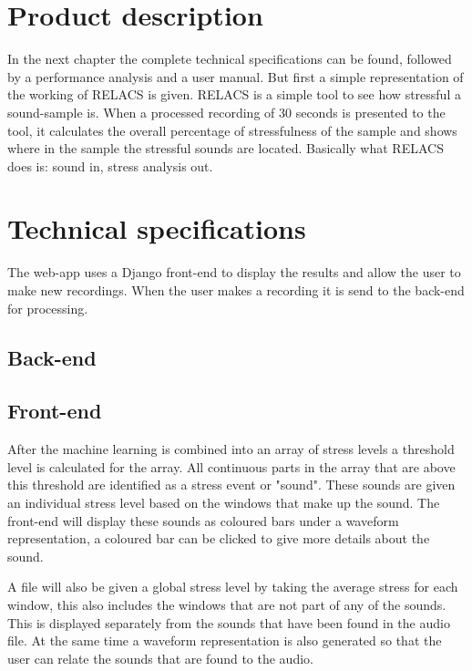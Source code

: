\documentclass[a4paper]{article}
\begin{document}
\section{Product description}
In the next chapter the complete technical specifications can be found, followed by a performance analysis and a user manual. 
But first a simple representation of the working of RELACS is given. RELACS is a simple tool to see how stressful a sound-sample is. 
When a processed recording of 30 seconds is presented to the tool, it calculates the overall percentage of stressfulness of the sample and shows where in the sample the stressful sounds are located. 
Basically what RELACS does is: sound in, stress analysis out.


\section{Technical specifications}

The web-app uses a Django front-end to display the results and allow the user
to make new recordings. When the user makes a recording it is send to the back-end for processing. 

\subsection{Back-end}



\subsection{Front-end}

After the machine learning is combined into an array of stress levels a threshold 
level is calculated for the array. All continuous parts in the array that are
above this threshold are identified as a stress event or "sound". These sounds
are given an individual stress level based on the windows that make up the
sound. The front-end will display these sounds as coloured bars under a waveform
representation, a coloured bar can be clicked to give more details about the
sound.

A file will also be given a global stress level by taking the average stress
for each window, this also includes the windows that are not part of any of the
sounds. This is displayed separately from the sounds that have been found in
the audio file. At the same time a waveform representation is also generated so
that the user can relate the sounds that are found to the audio.
\end{document}
